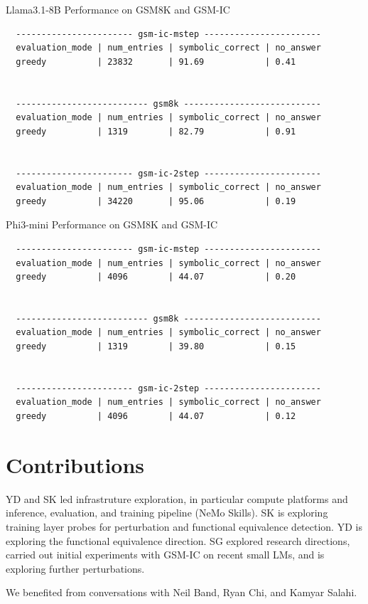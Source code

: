 \documentclass{article}
\begin{document}
Llama3.1-8B Performance on GSM8K and GSM-IC
\begin{verbatim}
  ----------------------- gsm-ic-mstep -----------------------
  evaluation_mode | num_entries | symbolic_correct | no_answer
  greedy          | 23832       | 91.69            | 0.41     


  -------------------------- gsm8k ---------------------------
  evaluation_mode | num_entries | symbolic_correct | no_answer
  greedy          | 1319        | 82.79            | 0.91     


  ----------------------- gsm-ic-2step -----------------------
  evaluation_mode | num_entries | symbolic_correct | no_answer
  greedy          | 34220       | 95.06            | 0.19  \end{verbatim}

Phi3-mini Performance on GSM8K and GSM-IC
\begin{verbatim}
  ----------------------- gsm-ic-mstep -----------------------
  evaluation_mode | num_entries | symbolic_correct | no_answer
  greedy          | 4096        | 44.07            | 0.20     
  
  
  -------------------------- gsm8k ---------------------------
  evaluation_mode | num_entries | symbolic_correct | no_answer
  greedy          | 1319        | 39.80            | 0.15     
  
  
  ----------------------- gsm-ic-2step -----------------------
  evaluation_mode | num_entries | symbolic_correct | no_answer
  greedy          | 4096        | 44.07            | 0.12   \end{verbatim}


\section{Contributions}
YD and SK led infrastruture exploration, in particular compute platforms and inference, evaluation, and training pipeline (NeMo Skills). SK is exploring training layer probes for perturbation and functional equivalence detection. YD is exploring the functional equivalence direction.  SG explored research directions, carried out initial experiments with GSM-IC on recent small LMs, and is exploring further perturbations.

We benefited from conversations with Neil Band, Ryan Chi, and Kamyar Salahi.



\end{document}
